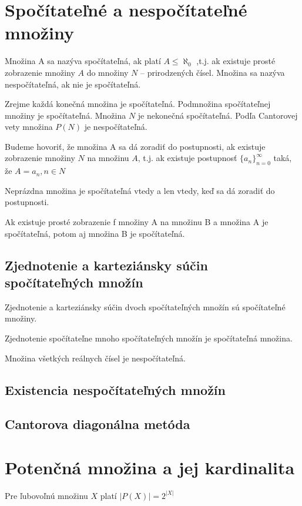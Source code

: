 \section {Spočítateľné a nespočítateľné množiny}

	Množina A sa nazýva spočítateľná, ak platí $A \leq \aleph_{0}$ ,t.j. ak existuje prosté zobrazenie množiny $A$ do množiny $N$ – prirodzených čísel. Množina sa nazýva nespočítateľná, ak nie je spočítateľná.

	Zrejme každá konečná množina je spočítateľná. Podmnožina spočítateľnej množiny je
	spočítateľná. Množina $N$ je nekonečná spočítateľná. Podľa Cantorovej vety množina $P(N)$ je
	nespočítateľná.

	Budeme hovoriť, že množina A sa dá zoradiť do postupnosti, ak existuje zobrazenie množiny $N$ na množinu $A$, t.j. ak existuje postupnosť $\{a_{n}\}_{n=0}^{\infty} $ taká, že $A={a_{n}, n \in N}$

	Neprázdna množina je spočítateľná vtedy a len vtedy, keď sa dá zoradiť do postupnosti.

	Ak existuje prosté zobrazenie f množiny A na množinu B a množina A je spočítateľná, potom aj množina B je spočítateľná.

	\subsection{Zjednotenie a karteziánsky súčin spočítateľných množín}


	Zjednotenie a karteziánsky súčin dvoch spočítateľných množín sú spočítateľné množiny.

	Zjednotenie spočítateľne mnoho spočítateľných množín je spočítateľná množina.

	Množina všetkých reálnych čísel je nespočítateľná.


  	\subsection{Existencia nespočítateľných množín}

	\subsection{Cantorova diagonálna metóda}



\section {Potenčná množina a jej kardinalita}
	Pre ľubovoľnú množinu $X$ platí $|P (X)| = 2^{|X|}$
